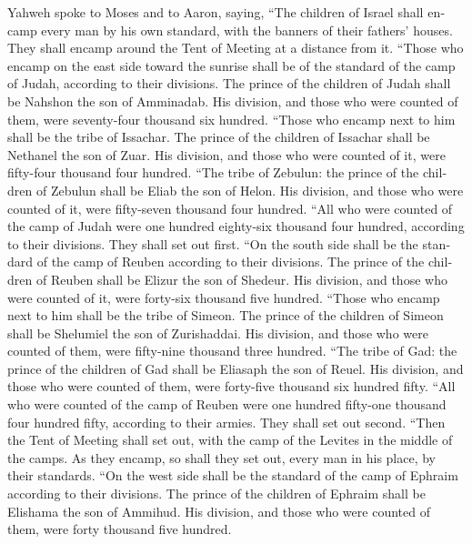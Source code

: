 \begin{paracol}{2}
\begin{otherlanguage}{english}
 Yahweh spoke to Moses and to Aaron, saying,
 ``The children of Israel shall encamp every man by his
own standard, with the banners of their fathers' houses. They shall
encamp around the Tent of Meeting at a distance from it. 
``Those who encamp on the east side toward the sunrise shall be of the
standard of the camp of Judah, according to their divisions. The prince
of the children of Judah shall be Nahshon the son of Amminadab.
 His division, and those who were counted of them, were
seventy-four thousand six hundred.  ``Those who encamp
next to him shall be the tribe of Issachar. The prince of the children
of Issachar shall be Nethanel the son of Zuar.  His
division, and those who were counted of it, were fifty-four thousand
four hundred.  ``The tribe of Zebulun: the prince of the
children of Zebulun shall be Eliab the son of Helon.  His
division, and those who were counted of it, were fifty-seven thousand
four hundred.  ``All who were counted of the camp of Judah
were one hundred eighty-six thousand four hundred, according to their
divisions. They shall set out first.  ``On the south side
shall be the standard of the camp of Reuben according to their
divisions. The prince of the children of Reuben shall be Elizur the son
of Shedeur.  His division, and those who were counted of
it, were forty-six thousand five hundred.  ``Those who
encamp next to him shall be the tribe of Simeon. The prince of the
children of Simeon shall be Shelumiel the son of Zurishaddai.
 His division, and those who were counted of them, were
fifty-nine thousand three hundred.  ``The tribe of Gad:
the prince of the children of Gad shall be Eliasaph the son of Reuel.
 His division, and those who were counted of them, were
forty-five thousand six hundred fifty.  ``All who were
counted of the camp of Reuben were one hundred fifty-one thousand four
hundred fifty, according to their armies. They shall set out second.
 ``Then the Tent of Meeting shall set out, with the camp
of the Levites in the middle of the camps. As they encamp, so shall they
set out, every man in his place, by their standards. 
``On the west side shall be the standard of the camp of Ephraim
according to their divisions. The prince of the children of Ephraim
shall be Elishama the son of Ammihud.  His division, and
those who were counted of them, were forty thousand five hundred.

\end{otherlanguage}
\end{paracol}
